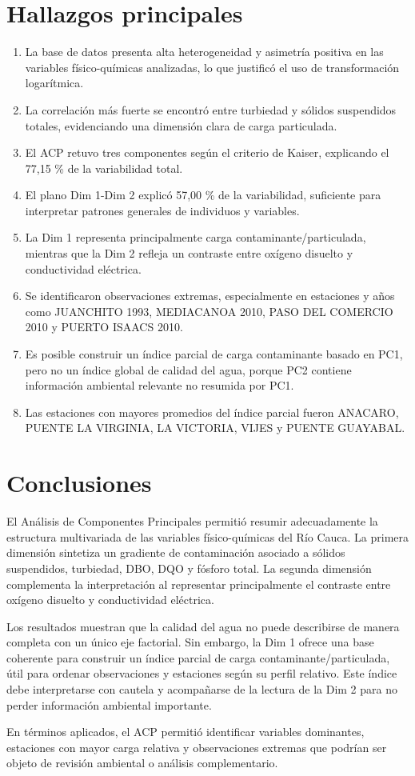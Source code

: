 \documentclass[12pt,letterpaper]{article}
\begin{document}
\section{Hallazgos principales}

\begin{enumerate}
  \item La base de datos presenta alta heterogeneidad y asimetría positiva en las variables físico-químicas analizadas, lo que justificó el uso de transformación logarítmica.
  \item La correlación más fuerte se encontró entre turbiedad y sólidos suspendidos totales, evidenciando una dimensión clara de carga particulada.
  \item El ACP retuvo tres componentes según el criterio de Kaiser, explicando el 77,15 \% de la variabilidad total.
  \item El plano Dim 1-Dim 2 explicó 57,00 \% de la variabilidad, suficiente para interpretar patrones generales de individuos y variables.
  \item La Dim 1 representa principalmente carga contaminante/particulada, mientras que la Dim 2 refleja un contraste entre oxígeno disuelto y conductividad eléctrica.
  \item Se identificaron observaciones extremas, especialmente en estaciones y años como JUANCHITO 1993, MEDIACANOA 2010, PASO DEL COMERCIO 2010 y PUERTO ISAACS 2010.
  \item Es posible construir un índice parcial de carga contaminante basado en PC1, pero no un índice global de calidad del agua, porque PC2 contiene información ambiental relevante no resumida por PC1.
  \item Las estaciones con mayores promedios del índice parcial fueron ANACARO, PUENTE LA VIRGINIA, LA VICTORIA, VIJES y PUENTE GUAYABAL.
\end{enumerate}

\section{Conclusiones}

El Análisis de Componentes Principales permitió resumir adecuadamente la estructura multivariada de las variables físico-químicas del Río Cauca. La primera dimensión sintetiza un gradiente de contaminación asociado a sólidos suspendidos, turbiedad, DBO, DQO y fósforo total. La segunda dimensión complementa la interpretación al representar principalmente el contraste entre oxígeno disuelto y conductividad eléctrica.

Los resultados muestran que la calidad del agua no puede describirse de manera completa con un único eje factorial. Sin embargo, la Dim 1 ofrece una base coherente para construir un índice parcial de carga contaminante/particulada, útil para ordenar observaciones y estaciones según su perfil relativo. Este índice debe interpretarse con cautela y acompañarse de la lectura de la Dim 2 para no perder información ambiental importante.

En términos aplicados, el ACP permitió identificar variables dominantes, estaciones con mayor carga relativa y observaciones extremas que podrían ser objeto de revisión ambiental o análisis complementario.
\end{document}
